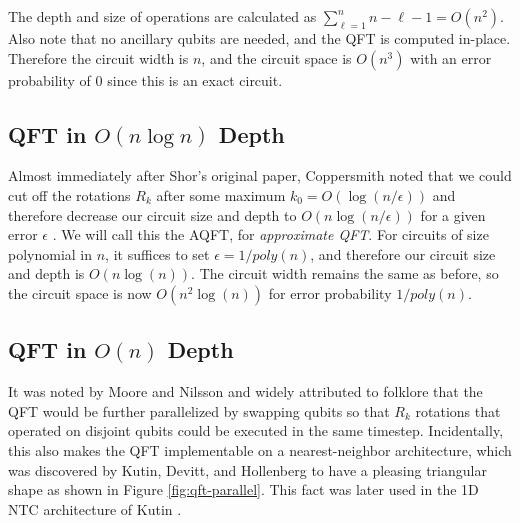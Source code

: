 
The depth and size of operations are calculated as
$\sum_{\ell=1}^n n-\ell-1 = O(n^2)$.
Also note that no ancillary qubits are needed, and the QFT is computed
in-place. Therefore the circuit width is $n$, and the circuit space is
$O(n^3)$ with an error probability of $0$ since this is an exact circuit.

\subsection{QFT in $O(n\log n)$ Depth}
\label{subsec:qft-loglin}

Almost immediately after Shor's original paper, Coppersmith noted that we
could cut off the rotations $R_k$ after some maximum $k_0 = O(\log(n/\epsilon))$
and therefore decrease
our circuit size and depth to $O(n\log(n/\epsilon))$ for a given
error $\epsilon$ \cite{Coppersmith1994}. We will call this the AQFT,
for \emph{approximate QFT}. For circuits of size polynomial
in $n$, it suffices to set $\epsilon = 1/poly(n)$, and therefore our
circuit size and depth is $O(n\log(n))$. The circuit width remains the same
as before, so the circuit space is now $O(n^2\log(n))$ for
error probability $1/poly(n)$.


\subsection{QFT in $O(n)$ Depth}
\label{subsec:qft-linear}

It was noted by Moore and Nilsson \cite{Moore1998} and widely attributed
to folklore that the QFT would be further parallelized by swapping qubits
so that $R_k$ rotations that operated on disjoint qubits could be executed
in the same timestep. Incidentally, this also makes the QFT implementable
on a nearest-neighbor architecture, which was discovered by Kutin, Devitt,
and Hollenberg \cite{Fowler2004} to have a pleasing triangular shape
as shown in Figure \ref{fig:qft-parallel}. This fact was later
used in the 1D NTC
architecture of Kutin \cite{Kutin2006}.

